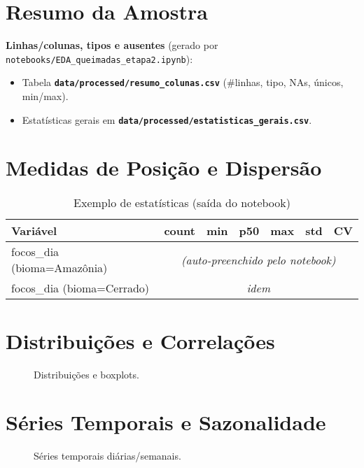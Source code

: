 \documentclass[12pt,a4paper]{report}
\begin{document}
\section{Resumo da Amostra}
\noindent\textbf{Linhas/colunas, tipos e ausentes} (gerado por \texttt{notebooks/EDA\_queimadas\_etapa2.ipynb}):  
\begin{itemize}
  \item Tabela \textbf{\texttt{data/processed/resumo\_colunas.csv}} (\#linhas, tipo, NAs, únicos, min/max).
  \item Estatísticas gerais em \textbf{\texttt{data/processed/estatisticas\_gerais.csv}}.
\end{itemize}

\section{Medidas de Posição e Dispersão}
\begin{table}[h]
\centering
\caption{Exemplo de estatísticas (saída do notebook)}
\label{tab:stats}
\begin{tabular}{lrrrrrr}
\toprule
\textbf{Variável} & \textbf{count} & \textbf{min} & \textbf{p50} & \textbf{max} & \textbf{std} & \textbf{CV} \\
\midrule
focos\_dia (bioma=Amazônia) & \multicolumn{6}{c}{\emph{(auto-preenchido pelo notebook)}}\\
focos\_dia (bioma=Cerrado)  & \multicolumn{6}{c}{\emph{idem}}\\
\bottomrule
\end{tabular}
\end{table}

\section{Distribuições e Correlações}
\begin{figure}[h]
\centering
{}
\caption{Distribuições e boxplots.}
\label{fig:dist}
\end{figure}

\section{Séries Temporais e Sazonalidade}
\begin{figure}[h]
\centering
{}
\caption{Séries temporais diárias/semanais.}
\label{fig:series}
\end{figure}
\end{document}
